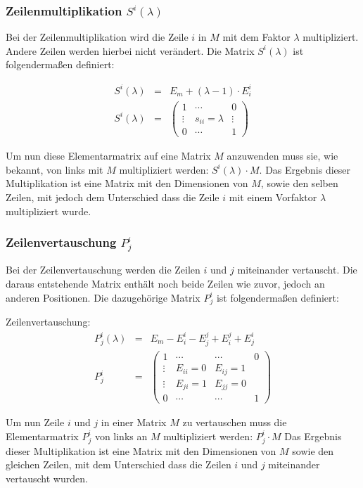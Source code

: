 \subsubsection{Zeilenmultiplikation $S^i(\lambda)$}
Bei der Zeilenmultiplikation wird die Zeile $i$ in $M$ mit dem Faktor $\lambda$ multipliziert. Andere Zeilen werden hierbei nicht verändert. Die Matrix $S^i(\lambda)$ ist folgendermaßen definiert:
\begin{Def}
\begin{align*}
	S^i(\lambda) &=& E_m + (\lambda - 1) \cdot E^i_i \\
	S^i(\lambda) &=& 
	\begin{pmatrix}
	1 & \cdots & 0 \\ 
	\vdots & s_{ii} = \lambda & \vdots \\ 
	0 & \cdots & 1
	\end{pmatrix} 
\end{align*}
\end{Def}
\raggedright Um nun diese Elementarmatrix auf eine Matrix $M$ anzuwenden muss sie, wie bekannt, von links mit $M$ multipliziert werden: $S^i(\lambda) \cdot M$. 
Das Ergebnis dieser Multiplikation ist eine Matrix mit den Dimensionen von $M$, sowie den selben Zeilen, mit jedoch dem Unterschied dass die Zeile $i$ mit einem Vorfaktor $\lambda$ multipliziert wurde.

\subsubsection{Zeilenvertauschung $P^i_j$}
Bei der Zeilenvertauschung werden die Zeilen $i$ und $j$ miteinander vertauscht. Die daraus entstehende Matrix enthält noch beide Zeilen wie zuvor, jedoch an anderen Positionen. Die dazugehörige Matrix $P^i_j$ ist folgendermaßen definiert:
\begin{Def} Zeilenvertauschung:
\begin{align*}
	P_j^i(\lambda) &=& E_m - E^i_i - E^j_j + E^j_i + E^i_j \\
	P^i_j &=& 
	\begin{pmatrix}
	1 & \cdots & \cdots & 0 \\ 
	\vdots & E_{ii} = 0 & E_{ij} = 1 &  \\ 
	\vdots & E_{ji} = 1 & E_{jj} = 0 &  \\ 
	0 & \cdots & \cdots & 1
	\end{pmatrix} 
\end{align*}
\end{Def}
\raggedright Um nun Zeile $i$ und $j$ in einer Matrix $M$ zu vertauschen muss die Elementarmatrix $P^i_j$ von links an $M$ multipliziert werden: $P^i_j \cdot M$
Das Ergebnis dieser Multiplikation ist eine Matrix mit den Dimensionen von $M$ sowie den gleichen Zeilen, mit dem Unterschied dass die Zeilen $i$ und $j$ miteinander vertauscht wurden.